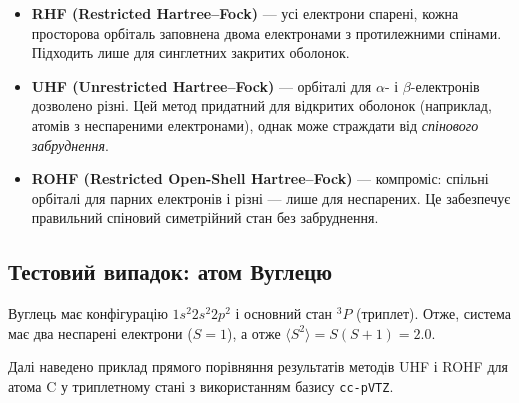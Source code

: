 \begin{itemize}
    \item \textbf{RHF (Restricted Hartree–Fock)} --- усі електрони спарені, кожна просторова орбіталь заповнена двома електронами з протилежними спінами.
          Підходить лише для синглетних закритих оболонок.

    \item \textbf{UHF (Unrestricted Hartree–Fock)} --- орбіталі для $\alpha$- і $\beta$-електронів дозволено різні.
          Цей метод придатний для відкритих оболонок (наприклад, атомів з неспареними електронами), однак може страждати від \emph{спінового забруднення}.

    \item \textbf{ROHF (Restricted Open-Shell Hartree–Fock)} --- компроміс: спільні орбіталі для парних електронів і різні --- лише для неспарених.
          Це забезпечує правильний спіновий симетрійний стан без забруднення.
\end{itemize}

\subsection{Тестовий випадок: атом Вуглецю}

Вуглець має конфігурацію $1s^2 2s^2 2p^2$ і основний стан $^3P$ (триплет).
Отже, система має два неспарені електрони ($S=1$), а отже $\langle S^2 \rangle = S(S+1) = 2.0$.

Далі наведено приклад прямого порівняння результатів методів UHF і ROHF для атома C у триплетному стані з використанням базису \texttt{cc-pVTZ}.

